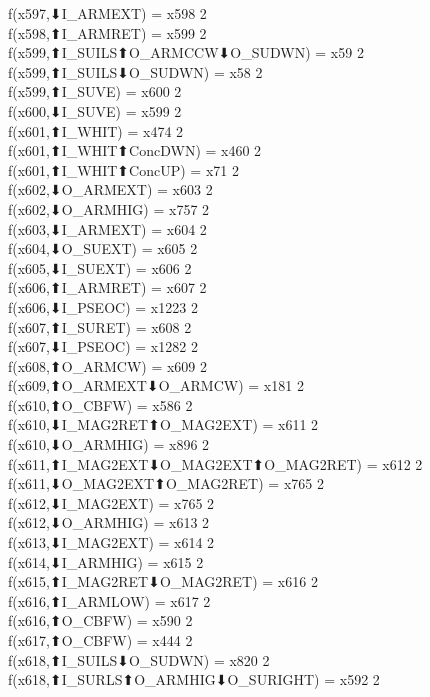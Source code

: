 f(x597,⬇I_ARMEXT) = x598 {2} \\
f(x598,⬆I_ARMRET) = x599 {2} \\
f(x599,⬆I_SUILS⬆O_ARMCCW⬇O_SUDWN) = x59 {2} \\
f(x599,⬆I_SUILS⬇O_SUDWN) = x58 {2} \\
f(x599,⬆I_SUVE) = x600 {2} \\
f(x600,⬇I_SUVE) = x599 {2} \\
f(x601,⬆I_WHIT) = x474 {2} \\
f(x601,⬆I_WHIT⬆ConcDWN) = x460 {2} \\
f(x601,⬆I_WHIT⬆ConcUP) = x71 {2} \\
f(x602,⬇O_ARMEXT) = x603 {2} \\
f(x602,⬇O_ARMHIG) = x757 {2} \\
f(x603,⬇I_ARMEXT) = x604 {2} \\
f(x604,⬇O_SUEXT) = x605 {2} \\
f(x605,⬇I_SUEXT) = x606 {2} \\
f(x606,⬆I_ARMRET) = x607 {2} \\
f(x606,⬇I_PSEOC) = x1223 {2} \\
f(x607,⬆I_SURET) = x608 {2} \\
f(x607,⬇I_PSEOC) = x1282 {2} \\
f(x608,⬆O_ARMCW) = x609 {2} \\
f(x609,⬆O_ARMEXT⬇O_ARMCW) = x181 {2} \\
f(x610,⬆O_CBFW) = x586 {2} \\
f(x610,⬇I_MAG2RET⬆O_MAG2EXT) = x611 {2} \\
f(x610,⬇O_ARMHIG) = x896 {2} \\
f(x611,⬆I_MAG2EXT⬇O_MAG2EXT⬆O_MAG2RET) = x612 {2} \\
f(x611,⬇O_MAG2EXT⬆O_MAG2RET) = x765 {2} \\
f(x612,⬇I_MAG2EXT) = x765 {2} \\
f(x612,⬇O_ARMHIG) = x613 {2} \\
f(x613,⬇I_MAG2EXT) = x614 {2} \\
f(x614,⬇I_ARMHIG) = x615 {2} \\
f(x615,⬆I_MAG2RET⬇O_MAG2RET) = x616 {2} \\
f(x616,⬆I_ARMLOW) = x617 {2} \\
f(x616,⬆O_CBFW) = x590 {2} \\
f(x617,⬆O_CBFW) = x444 {2} \\
f(x618,⬆I_SUILS⬇O_SUDWN) = x820 {2} \\
f(x618,⬆I_SURLS⬆O_ARMHIG⬇O_SURIGHT) = x592 {2} \\
